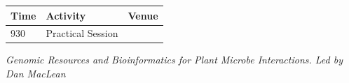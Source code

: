 \documentclass[12pt,]{book}
\theoremstyle{definition}
\theoremstyle{definition}
\theoremstyle{remark}
\begin{document}
\begin{longtable}[]{@{}lll@{}}
\toprule
\begin{minipage}[b]{0.09\columnwidth}\raggedright\strut
Time\strut
\end{minipage} & \begin{minipage}[b]{0.23\columnwidth}\raggedright\strut
Activity\strut
\end{minipage} & \begin{minipage}[b]{0.09\columnwidth}\raggedright\strut
Venue\strut
\end{minipage}\tabularnewline
\midrule
\endhead
\begin{minipage}[t]{0.09\columnwidth}\raggedright\strut
930\strut
\end{minipage} & \begin{minipage}[t]{0.23\columnwidth}\raggedright\strut
Practical Session\strut
\end{minipage} & \begin{minipage}[t]{0.09\columnwidth}\raggedright\strut
\strut
\end{minipage}\tabularnewline
\bottomrule
\end{longtable}

\emph{Genomic Resources and Bioinformatics for Plant Microbe
Interactions. Led by Dan MacLean}
\end{document}
